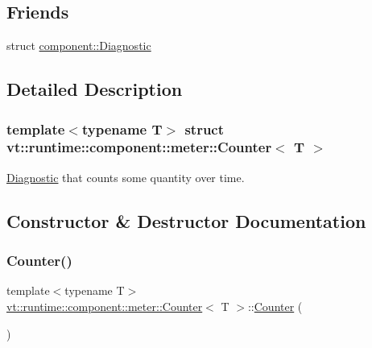 \subsection*{Friends}
\begin{DoxyCompactItemize}
\item 
struct \hyperlink{structvt_1_1runtime_1_1component_1_1meter_1_1_counter_a48f263de9dbf26c1fc7736031cca9613}{component\+::\+Diagnostic}
\end{DoxyCompactItemize}


\subsection{Detailed Description}
\subsubsection*{template$<$typename T$>$\newline
struct vt\+::runtime\+::component\+::meter\+::\+Counter$<$ T $>$}

\hyperlink{structvt_1_1runtime_1_1component_1_1_diagnostic}{Diagnostic} that counts some quantity over time. 

\subsection{Constructor \& Destructor Documentation}
\mbox{\label{structvt_1_1runtime_1_1component_1_1meter_1_1_counter_afbe8191f66fc515812ee5bf1b5d857a8}} 
\subsubsection{\texorpdfstring{Counter()}{Counter()}\hspace{0.1cm}{\footnotesize\ttfamily [1/2]}}
{\footnotesize\ttfamily template$<$typename T$>$ \\
\hyperlink{structvt_1_1runtime_1_1component_1_1meter_1_1_counter}{vt\+::runtime\+::component\+::meter\+::\+Counter}$<$ T $>$\+::\hyperlink{structvt_1_1runtime_1_1component_1_1meter_1_1_counter}{Counter} (\begin{DoxyParamCaption}{ }\end{DoxyParamCaption})\hspace{0.3cm}{\ttfamily [default]}}



